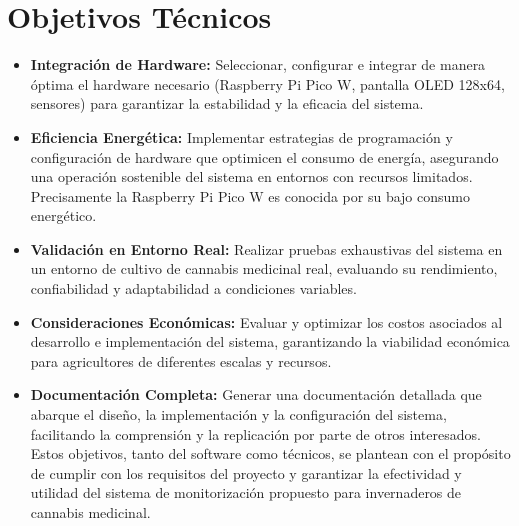\section{Objetivos Técnicos}
\begin{itemize}
\item \textbf{Integración de Hardware:} 
Seleccionar, configurar e integrar de manera óptima el hardware necesario (Raspberry Pi Pico W, pantalla OLED 128x64, sensores) para garantizar la estabilidad y la eficacia del sistema.

\item \textbf{Eficiencia Energética:}
Implementar estrategias de programación y configuración de hardware que optimicen el consumo de energía, asegurando una operación sostenible del sistema en entornos con recursos limitados. Precisamente la Raspberry Pi Pico W es conocida por su bajo consumo energético.

\item \textbf{Validación en Entorno Real:}
Realizar pruebas exhaustivas del sistema en un entorno de cultivo de cannabis medicinal real, evaluando su rendimiento, confiabilidad y adaptabilidad a condiciones variables.

\item \textbf{Consideraciones Económicas:}
Evaluar y optimizar los costos asociados al desarrollo e implementación del sistema, garantizando la viabilidad económica para agricultores de diferentes escalas y recursos.

\item \textbf{Documentación Completa:}
Generar una documentación detallada que abarque el diseño, la implementación y la configuración del sistema, facilitando la comprensión y la replicación por parte de otros interesados.
Estos objetivos, tanto del software como técnicos, se plantean con el propósito de cumplir con los requisitos del proyecto y garantizar la efectividad y utilidad del sistema de monitorización propuesto para invernaderos de cannabis medicinal.
\end{itemize}
